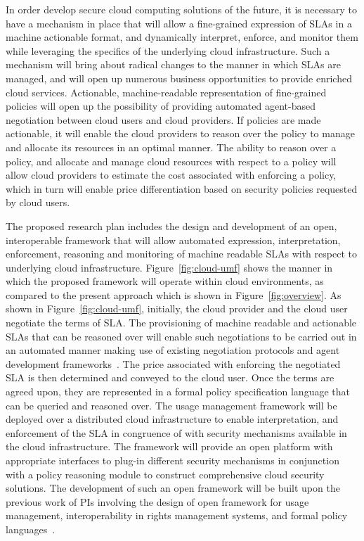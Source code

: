 \documentclass[10pt, conference, compsoc]{IEEEtran}
\begin{document}
In order develop secure cloud computing solutions of the future, it is necessary to have a mechanism in place that will allow a fine-grained expression of SLAs in a machine actionable format, and dynamically interpret, enforce, and monitor them while leveraging the specifics of the underlying cloud infrastructure. Such a mechanism will bring about radical changes to the manner in which SLAs are managed, and will open up numerous business opportunities to provide enriched cloud services. Actionable, machine-readable representation of fine-grained policies will open up the possibility of providing automated agent-based negotiation between cloud users and cloud providers. If policies are made actionable, it will enable the cloud providers to reason over the policy to manage and allocate its resources in an optimal manner. The ability to reason over a policy, and allocate and manage cloud resources with respect to a policy will allow cloud providers to estimate the cost associated with enforcing a policy, which in turn will enable price differentiation based on security policies requested by cloud users.
 
The proposed research plan includes the design and development of an open, interoperable framework that will allow automated expression, interpretation, enforcement, reasoning and monitoring of machine readable SLAs with respect to underlying cloud infrastructure. Figure~\ref{fig:cloud-umf} shows the manner in which the proposed framework will operate within cloud environments, as compared to the present approach which is shown in Figure~\ref{fig:overview}. As shown in Figure~\ref{fig:cloud-umf}, initially, the cloud provider and the cloud user negotiate the terms of SLA. The provisioning of machine readable and actionable SLAs that can be reasoned over will enable such negotiations to be carried out in an automated manner making use of existing negotiation protocols and agent development frameworks~\cite{BePoRi:02,FIPA}. The price associated with enforcing the negotiated SLA is then determined and conveyed to the cloud user. Once the terms are agreed upon, they are represented in a formal policy specification language that can be queried and reasoned over. The usage management framework will be deployed over a distributed cloud infrastructure to enable interpretation, and enforcement of the SLA in congruence of with security mechanisms available in the cloud infrastructure. The framework will provide an open platform with appropriate interfaces to plug-in different security mechanisms in conjunction with a policy reasoning module to construct comprehensive cloud security solutions. The development of such an open framework will be built upon the previous work of PIs involving the design of open framework for usage management, interoperability in rights management systems, and formal policy languages~\cite{JaHe:09,JaHeLa:10}.
\end{document}
